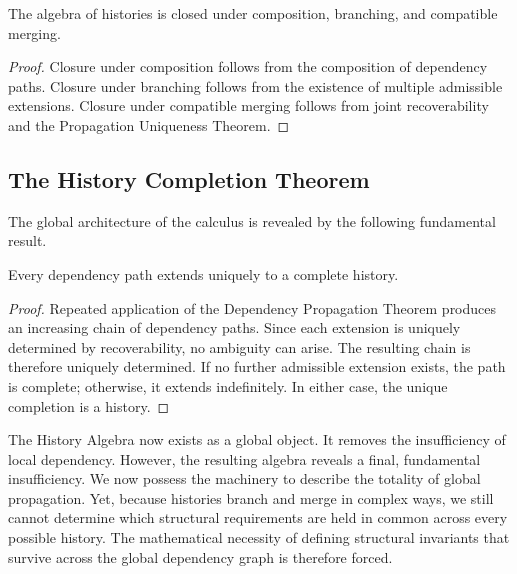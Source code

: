\documentclass[12pt,anyside]{book}
\begin{document}
\begin{theorem}
The algebra of histories is closed under composition, branching, and compatible merging.
\end{theorem}
\begin{proof}
Closure under composition follows from the composition of dependency paths. Closure under branching follows from the existence of multiple admissible extensions. Closure under compatible merging follows from joint recoverability and the Propagation Uniqueness Theorem.
\end{proof}

\subsection{The History Completion Theorem}
The global architecture of the calculus is revealed by the following fundamental result.

\begin{theorem}
Every dependency path extends uniquely to a complete history.
\end{theorem}
\begin{proof}
Repeated application of the Dependency Propagation Theorem produces an increasing chain of dependency paths. Since each extension is uniquely determined by recoverability, no ambiguity can arise. The resulting chain is therefore uniquely determined. If no further admissible extension exists, the path is complete; otherwise, it extends indefinitely. In either case, the unique completion is a history.
\end{proof}

The History Algebra now exists as a global object. It removes the insufficiency of local dependency. However, the resulting algebra reveals a final, fundamental insufficiency. We now possess the machinery to describe the totality of global propagation. Yet, because histories branch and merge in complex ways, we still cannot determine which structural requirements are held in common across every possible history. The mathematical necessity of defining structural invariants that survive across the global dependency graph is therefore forced. 
\end{document}
